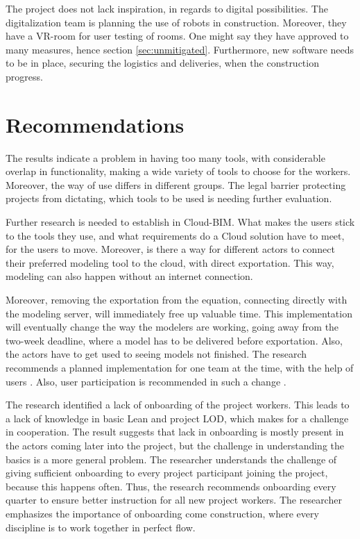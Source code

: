The project does not lack inspiration, in regards to digital possibilities. The digitalization team is planning the use of robots in construction. Moreover, they have a VR-room for user testing of rooms. One might say they have approved to many measures, hence section \ref{sec:unmitigated}. Furthermore, new software needs to be in place, securing the logistics and deliveries, when the construction progress. 

\section{Recommendations} \label{sec:recommendations}
The results indicate a problem in having too many tools, with considerable overlap in functionality, making a wide variety of tools to choose for the workers. Moreover, the way of use differs in different groups. The legal barrier protecting projects from dictating, which tools to be used is needing further evaluation. 

Further research is needed to establish in Cloud-BIM. What makes the users stick to the tools they use, and what requirements do a Cloud solution have to meet, for the users to move. Moreover, is there a way for different actors to connect their preferred modeling tool to the cloud, with direct exportation. This way, modeling can also happen without an internet connection.  

Moreover, removing the exportation from the equation, connecting directly with the modeling server, will immediately free up valuable time. This implementation will eventually change the way the modelers are working, going away from the two-week deadline, where a model has to be delivered before exportation. Also, the actors have to get used to seeing models not finished. The research recommends a planned implementation for one team at the time, with the help of users \citep{bratteteig2016unpacking}. Also, user participation is recommended in such a change \citep{hatling1998social, ehn1993scandinavian}.

The research identified a lack of onboarding of the project workers. This leads to a lack of knowledge in basic Lean and project LOD, which makes for a challenge in cooperation. The result suggests that lack in onboarding is mostly present in the actors coming later into the project, but the challenge in understanding the basics is a more general problem. The researcher understands the challenge of giving sufficient onboarding to every project participant joining the project, because this happens often. Thus, the research recommends onboarding every quarter to ensure better instruction for all new project workers. The researcher emphasizes the importance of onboarding come construction, where every discipline is to work together in perfect flow.

